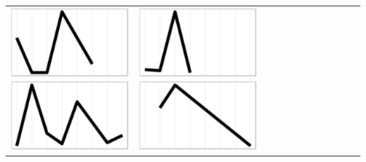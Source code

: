 \documentclass[conference]{worldcomp}
\begin{document}
\begin{table}
\begin{tabular}{ | b{1.5cm} | c | c | c | c | c | c | c | c | c | c | c |}
 \includegraphics[scale=0.08]{figures/bbba.ps} &  
 \includegraphics[scale=0.08]{figures/bcaa.ps} &  

\end{tabular}
\end{table}
\end{document}
